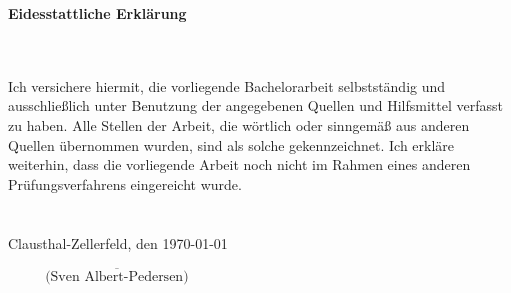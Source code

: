\newpage
\thispagestyle{empty}
\begin{center}
\LARGE\bfseries Eidesstattliche Erklärung\linebreak[4]
\end{center}
\noindent\\\\
\indent Ich versichere hiermit, die vorliegende Bachelorarbeit selbstständig und ausschließlich unter Benutzung der angegebenen Quellen und Hilfsmittel verfasst zu haben. Alle Stellen der Arbeit, die wörtlich oder sinngemäß aus anderen Quellen übernommen wurden, sind als solche gekennzeichnet. Ich erkläre weiterhin, dass die vorliegende Arbeit noch nicht im Rahmen eines anderen Prüfungsverfahrens eingereicht wurde.\\\\\\

Clausthal-Zellerfeld, den \today
\begin{flushright}
$\overline{~~~~~~~~~~~~\mbox{(Sven Albert-Pedersen)}~~~~~~~~~~~~}$
\end{flushright}